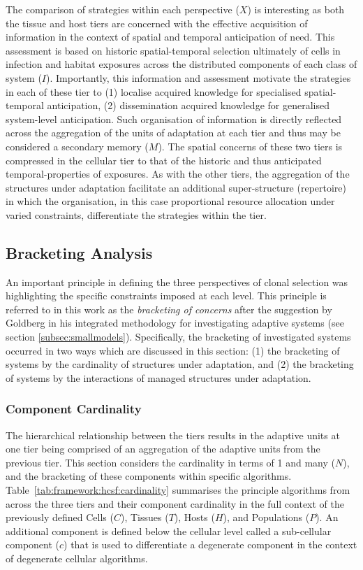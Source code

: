 The comparison of strategies within each perspective ($X$) is interesting as both the tissue and host tiers are concerned with the effective acquisition of information in the context of spatial and temporal anticipation of need. This assessment is based on historic spatial-temporal selection ultimately of cells in infection and habitat exposures across the distributed components of each class of system ($I$). Importantly, this information and assessment motivate the strategies in each of these tier to (1) localise acquired knowledge for specialised spatial-temporal anticipation, (2) dissemination acquired knowledge for generalised system-level anticipation. Such organisation of information is directly reflected across the aggregation of the units of adaptation at each tier and thus may be considered a secondary memory ($M$). The spatial concerns of these two tiers is compressed in the cellular tier to that of the historic and thus anticipated temporal-properties of exposures. As with the other tiers, the aggregation of the structures under adaptation facilitate an additional super-structure (repertoire) in which the organisation, in this case proportional resource allocation under varied constraints, differentiate the strategies within the tier. 

%
%
\subsection{Bracketing Analysis}
\label{sec:framework:hcsf:bracketing}
An important principle in defining the three perspectives of clonal selection was highlighting the specific constraints imposed at each level. This principle is referred to in this work as the \emph{bracketing of concerns} after the suggestion by Goldberg in his integrated methodology for investigating adaptive systems (see section \ref{subsec:smallmodels}). Specifically, the bracketing of investigated systems occurred in two ways which are discussed in this section: (1) the bracketing of systems by the cardinality of structures under adaptation, and (2) the bracketing of systems by the interactions of managed structures under adaptation.

%
%
\subsubsection{Component Cardinality}
The hierarchical relationship between the tiers results in the adaptive units at one tier being comprised of an aggregation of the adaptive units from the previous tier. This section considers the cardinality in terms of 1 and many ($N$), and the bracketing of these components within specific algorithms. Table~\ref{tab:framework:hcsf:cardinality} summarises the principle algorithms from across the three tiers and their component cardinality in the full context of the previously defined Cells ($C$), Tissues ($T$), Hosts ($H$), and Populations ($P$). An additional component is defined below the cellular level called a sub-cellular component ($c$) that is used to differentiate a degenerate component in the context of degenerate cellular algorithms. 

